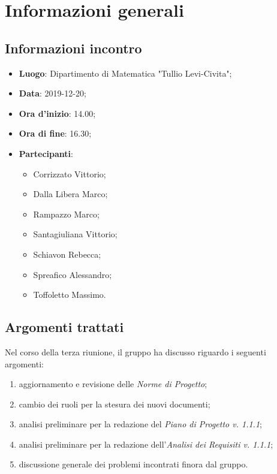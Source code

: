 \section{Informazioni generali}
    \subsection{Informazioni incontro}
        \begin{itemize}
            \item \textbf{Luogo}: Dipartimento di Matematica "Tullio Levi-Civita";
            \item \textbf{Data}: 2019-12-20;
            \item \textbf{Ora d'inizio}: 14.00;
            \item \textbf{Ora di fine}: 16.30;
            \item \textbf{Partecipanti}: \begin{itemize}
                \item Corrizzato Vittorio;
                \item Dalla Libera Marco;
                \item Rampazzo Marco;
                \item Santagiuliana Vittorio;
                \item Schiavon Rebecca;
                \item Spreafico Alessandro;
                \item Toffoletto Massimo.
            \end{itemize}
        \end{itemize}
    \subsection{Argomenti trattati}
        Nel corso della terza riunione, il gruppo ha discusso riguardo i seguenti argomenti:
        \begin{enumerate}
            \item aggiornamento e revisione delle \textit{Norme di Progetto};
            \item cambio dei ruoli per la stesura dei nuovi documenti;
            \item analisi preliminare per la redazione del \textit{Piano di Progetto v. 1.1.1};
            \item analisi preliminare per la redazione dell'\textit{Analisi dei Requisiti v. 1.1.1};
            \item discussione generale dei problemi incontrati finora dal gruppo.
        \end{enumerate}
